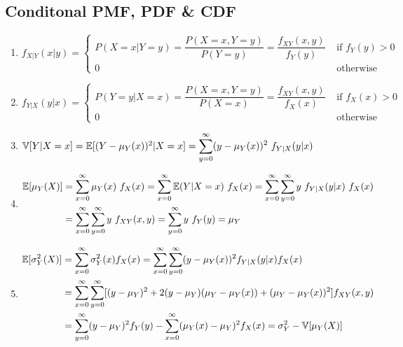 \subsection{Conditonal PMF, PDF \& CDF}

\begin{enumerate}[resume*=calcrulesrv]
    \item
    $
        f _{X|Y} (x|y)
        = \begin{cases}
            P(X = x|Y = y)
            = \dfrac{P(X = x, Y = y)} {P(Y = y) }
            = \dfrac{f _{X Y} (x, y)} {f_Y (y) } & \text{ if } f _Y (y) > 0 \\
            0 & \text{ otherwise}
        \end{cases}
    $
    \hfill \cite{statistics/book/Statistics-for-Data-Scientists/Maurits-Kaptein}

    \item
    $
        f _{Y|X} (y|x)
        = \begin{cases}
            P(Y = y|X = x)
            = \dfrac{P(X = x, Y = y)} {P(X = x) }
            = \dfrac{f _{X Y} (x, y)} {f_X (x) } & \text{ if } f _X (x) > 0 \\
            0 & \text{ otherwise}
        \end{cases}
    $
    \hfill \cite{statistics/book/Statistics-for-Data-Scientists/Maurits-Kaptein}

    \item
    $
        \mathbb{V}[Y |X = x]
        = \mathbb{E}[(Y - \mu_Y (x))^2|X = x]
        = \displaystyle\sum^\infty_{y=0} (y - \mu_Y (x))^2\ f_{Y |X} (y|x)
    $
    \hfill \cite{statistics/book/Statistics-for-Data-Scientists/Maurits-Kaptein}

    \item 
    $
        \begin{aligned}
           \mbbE[\mu_Y (X)] 
            &= \dsum^\infty_{x=0} \mu_Y (x)\ f_X (x)
            = \dsum^\infty_{x=0} \mbbE(Y |X = x)\ f_X (x)
            = \dsum^\infty_{x=0} \dsum^\infty_{y=0} y\ f_{Y |X} (y|x)\ f_X (x) \\
            &= \dsum^\infty_{x=0} \dsum^\infty_{y=0} y\ f_{X Y} (x, y)
            = \dsum^\infty_{y=0} y\ f_Y (y) 
            = \mu_Y
        \end{aligned}
    $
    \hfill \cite{statistics/book/Statistics-for-Data-Scientists/Maurits-Kaptein}

    \item 
    $
        \begin{aligned}
            \mathbb{E}[\sigma^2_Y (X)]
            &= \displaystyle\sum^\infty_{x=0} \sigma^2_Y (x) f_X (x)
            = \displaystyle\sum^\infty_{x=0} \displaystyle\sum^\infty_{y=0} (y - \mu_Y (x))^2 f_{Y |X} (y|x) f_X (x) \\
            &= \displaystyle\sum^\infty_{x=0} \displaystyle\sum^\infty_{y=0} [(y - \mu_Y )^2 + 2(y - \mu_Y )(\mu_Y - \mu_Y (x)) + (\mu_Y - \mu_Y (x))^2] f_{X Y} (x, y) \\
            &= \displaystyle\sum^\infty_{y=0} (y - \mu_Y )^2 f_Y (y) - \displaystyle\sum^\infty_{x=0} (\mu_Y (x) - \mu_Y )^2 f_X (x)
            = \sigma^2_Y - \mathbb{V}[\mu_Y (X)]
        \end{aligned}
    $
    \hfill \cite{statistics/book/Statistics-for-Data-Scientists/Maurits-Kaptein}
\end{enumerate}

